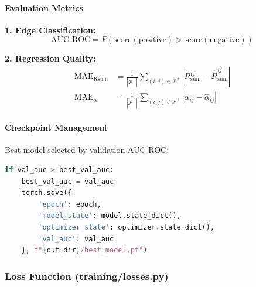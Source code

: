 \documentclass[12pt,a4paper]{article}
\begin{document}
\paragraph{Evaluation Metrics}

\textbf{1. Edge Classification:}
\begin{equation}
\text{AUC-ROC} = P(\text{score}(\text{positive}) > \text{score}(\text{negative}))
\end{equation}

\textbf{2. Regression Quality:}
\begin{align}
\text{MAE}_{\text{Rsum}} &= \frac{1}{|\mathcal{P}^+|} \sum_{(i,j) \in \mathcal{P}^+} |R_{\text{sum}}^{ij} - \hat{R}_{\text{sum}}^{ij}| \\
\text{MAE}_{\alpha} &= \frac{1}{|\mathcal{P}^+|} \sum_{(i,j) \in \mathcal{P}^+} |\alpha_{ij} - \hat{\alpha}_{ij}|
\end{align}

\paragraph{Checkpoint Management}
Best model selected by validation AUC-ROC:
\begin{lstlisting}[language=Python]
if val_auc > best_val_auc:
    best_val_auc = val_auc
    torch.save({
        'epoch': epoch,
        'model_state': model.state_dict(),
        'optimizer_state': optimizer.state_dict(),
        'val_auc': val_auc
    }, f"{out_dir}/best_model.pt")
\end{lstlisting}

\subsubsection{Loss Function (training/losses.py)}
\end{document}
